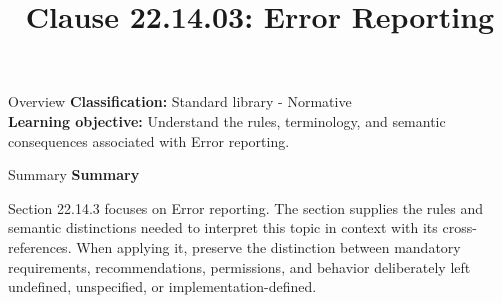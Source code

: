 \documentclass[10pt,letterpaper]{article}
\title{Clause 22.14.03: Error Reporting}
\author{}
\date{}
\begin{document}
\maketitle
\begin{CornellOverviewBox}{Overview}
\textbf{Classification:} Standard library - Normative\\[2pt]
\textbf{Learning objective:} Understand the rules, terminology, and semantic consequences associated with Error reporting.
\end{CornellOverviewBox}\begin{CornellSummaryBox}{Summary}
{\sffamily\bfseries\color{Accent} Summary}\par\vspace{3pt}Section 22.14.3 focuses on Error reporting. The section supplies the rules and semantic distinctions needed to interpret this topic in context with its cross-references. When applying it, preserve the distinction between mandatory requirements, recommendations, permissions, and behavior deliberately left undefined, unspecified, or implementation-defined.
\end{CornellSummaryBox}
\end{document}
